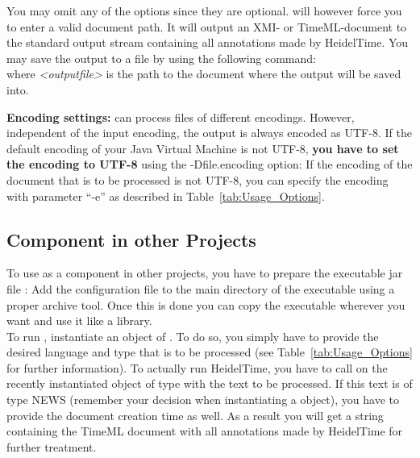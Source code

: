 You may omit any of the options since they are optional. \product{} will however force you to enter a valid document path. It will output an XMI- or TimeML-document to the standard output stream containing all annotations made by HeidelTime. You may save the output to a file by using the following command:\newline \texttt{} \\
where \emph{<outputfile>} is the path to the document where the output will be saved into.

\textbf{Encoding settings:}
\product{} can process files of different encodings. However, independent of the input encoding, the output is always encoded as UTF-8. If the default encoding of your Java Virtual Machine is not UTF-8, \textbf{you have to set the encoding to UTF-8} using the -Dfile.encoding option:
\newline \texttt{}\newline
If the encoding of the document that is to be processed is not UTF-8, you can specify the encoding with parameter ``-e'' as described in Table~\ref{tab:Usage_Options}.

\subsection{Component in other Projects}\label{sec:Usage_Component}
To use \product{} as a component in other projects, you have to prepare the executable jar file \executableFile{}: Add the configuration file \configFile{} to the main directory of the executable using a proper archive tool. Once this is done you can copy the executable wherever you want and use it like a library. \\
To run \product{}, instantiate an object of . To do so, you simply have to provide the desired language and type that is to be processed (see Table~\ref{tab:Usage_Options} for further information). To actually run HeidelTime, you have to call  on the recently instantiated object of type  with the text to be processed. If this text is of type NEWS (remember your decision when instantiating a  object), you have to provide the document creation time as well. As a result you will get a string containing the TimeML document with all annotations made by HeidelTime for further treatment.
